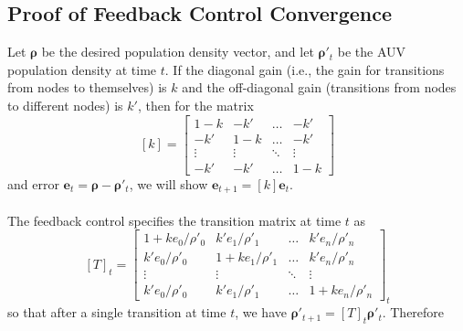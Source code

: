 \documentclass[11pt,letterpaper]{article}
\author{Kevin Smith}
\begin{document}
	
	\subsection*{Proof of Feedback Control Convergence}
	
	Let $\bm \rho$ be the desired population density vector, and let $\bm \rho'_t$ be the AUV population density at time $t$. If the diagonal gain (i.e., the gain for transitions from nodes to themselves) is $k$ and the off-diagonal gain (transitions from nodes to different nodes) is $k'$, then for the matrix
	\[
		[k] = \begin{bmatrix} 
				1-k & -k' & \dots & -k' \\
				-k' & 1-k & \dots & -k' \\
				\vdots & \vdots & \ddots & \vdots \\
				-k' & -k' & \dots & 1-k
			\end{bmatrix}
	\]
	and error $\bm e_t = \bm \rho - \bm \rho'_t$, we will show $\bm e_{t + 1} = [k] \bm e_t$.
	\\\\
	The feedback control specifies the transition matrix at time $t$ as
	\[
		[T]_t = \begin{bmatrix}
			1 + k e_0 / \rho'_0 & k' e_1 / \rho'_1 & \dots & k' e_n / \rho'_n \\
			k' e_0 / \rho'_0 & 1 + k e_1 / \rho'_1 & \dots & k' e_n / \rho'_n \\
			\vdots & \vdots & \ddots & \vdots \\
			k' e_0 / \rho'_0 & k' e_1 / \rho'_1 & \dots & 1 + k e_n / \rho'_n
		\end{bmatrix}_t
	\]
	so that after a single transition at time $t$, we have $\bm \rho'_{t + 1} = [T]_{t} \bm \rho'_t$. Therefore
\end{document}
